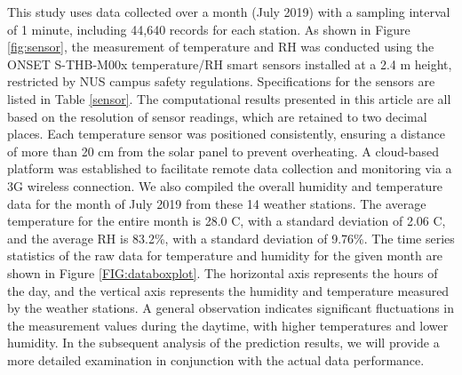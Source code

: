 \documentclass[a4paper,fleqn]{cas-sc}
\begin{document}

This study uses data collected over a month (July 2019) with a sampling interval of 1 minute, including 44,640 records for each station. As shown in Figure \ref{fig:sensor}, the measurement of temperature and RH was conducted using the ONSET S-THB-M00x temperature/RH smart sensors installed at a 2.4 m height, restricted by NUS campus safety regulations. Specifications for the sensors are listed in Table \ref{sensor}. The computational results presented in this article are all based on the resolution of sensor readings, which are retained to two decimal places. Each temperature sensor was positioned consistently, ensuring a distance of more than 20 cm from the solar panel to prevent overheating. A cloud-based platform was established to facilitate remote data collection and monitoring via a 3G wireless connection. We also compiled the overall humidity and temperature data for the month of July 2019 from these 14 weather stations. 
The average temperature for the entire month is 28.0 \textdegree C, with a standard deviation of 2.06 \textdegree C, and the average RH is 83.2\%, with a standard deviation of 9.76\%. The time series statistics of the raw data for temperature and humidity for the given month are shown in Figure \ref{FIG:databoxplot}. The horizontal axis represents the hours of the day, and the vertical axis represents the humidity and temperature measured by the weather stations. A general observation indicates significant fluctuations in the measurement values during the daytime, with higher temperatures and lower humidity. In the subsequent analysis of the prediction results, we will provide a more detailed examination in conjunction with the actual data performance.
\end{document}
